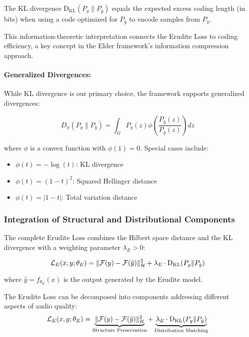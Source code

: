 \begin{theorem}
The KL divergence $\mathrm{D_{KL}}(P_y \| P_{\hat{y}})$ equals the expected excess coding length (in bits) when using a code optimized for $P_{\hat{y}}$ to encode samples from $P_y$.
\end{theorem}

This information-theoretic interpretation connects the Erudite Loss to coding efficiency, a key concept in the Elder framework's information compression approach.

\paragraph{Generalized Divergences:}
While KL divergence is our primary choice, the framework supports generalized divergences:

\begin{equation}
D_{\phi}(P_y \| P_{\hat{y}}) = \int_{\Omega} P_y(z) \phi\left(\frac{P_{\hat{y}}(z)}{P_y(z)}\right) dz
\end{equation}

where $\phi$ is a convex function with $\phi(1) = 0$. Special cases include:
\begin{itemize}
\item $\phi(t) = -\log(t)$: KL divergence
\item $\phi(t) = (1-t)^2$: Squared Hellinger distance
\item $\phi(t) = |1-t|$: Total variation distance
\end{itemize}

\subsubsection{Integration of Structural and Distributional Components}

The complete Erudite Loss combines the Hilbert space distance and the KL divergence with a weighting parameter $\lambda_E > 0$:

\begin{equation}
\mathcal{L}_E(x, y; \theta_E) = \|\mathcal{F}(y) - \mathcal{F}(\hat{y})\|_{\mathcal{H}}^2 + \lambda_E \cdot \mathrm{D_{KL}}(P_y \| P_{\hat{y}})
\end{equation}

where $\hat{y} = f_{\theta_E}(x)$ is the output generated by the Erudite model.

\begin{proposition}
The Erudite Loss can be decomposed into components addressing different aspects of audio quality:
\begin{equation}
\mathcal{L}_E(x, y; \theta_E) = \underbrace{\|\mathcal{F}(y) - \mathcal{F}(\hat{y})\|_{\mathcal{H}}^2}_{\text{Structure Preservation}} + \underbrace{\lambda_E \cdot \mathrm{D_{KL}}(P_y \| P_{\hat{y}})}_{\text{Distribution Matching}}
\end{equation}
\end{proposition}

